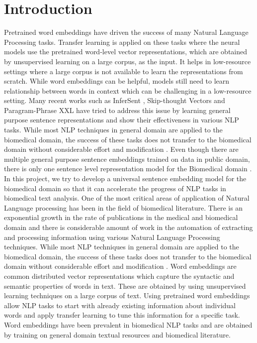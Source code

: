 \documentclass[11pt,a4paper]{article}
\begin{document}
\section{Introduction}
Pretrained word embeddings have driven the success of many Natural Language Processing tasks. Transfer learning is applied on these tasks where the neural models use the pretrained word-level vector representations, which are obtained by unsupervised learning on a large corpus, as the input. It helps in low-resource settings where a large corpus is not available to learn the representations from scratch. While word embeddings can be helpful, models still need to learn relationship between words in context which can be challenging in a low-resource setting. Many recent works such as InferSent \citep{conneau2017supervised}, Skip-thought Vectors\cite{kiros2015skip} and Paragram-Phrase XXL \cite{wieting2015towards} have tried to address this issue by learning general purpose sentence representations and show their effectiveness in various NLP tasks. While most NLP techniques in general domain are applied to the biomedical domain, the success of these tasks does not transfer to the biomedical domain without considerable effort and modification \cite{DBLP:sciSpacy}. Even though there are multiple general purpose sentence embeddings trained on data in public domain, there is only one sentence level representation model for the Biomedical domain \cite{chen2018biosentvec}. In this project, we try to develop a universal sentence embedding model for the biomedical domain so that it can accelerate the progress of NLP tasks in biomedical text analysis.
\iffalse
One of the most critical areas of application of Natural Language processing has been in the field of biomedical literature. There is an exponential growth in the rate of publications in the medical and biomedical domain \cite{DBLP:journals/corr/BornmannM14} and there is considerable amount of work in the automation of extracting and processing information using various Natural Language Processing techniques. While most NLP techniques in general domain are applied to the biomedical domain, the success of these tasks does not transfer to the biomedical domain without considerable effort and modification \cite{DBLP:sciSpacy}.
Word embeddings are common distributed vector representations which capture the syntactic and semantic properties of words in text. These are obtained by using unsupervised learning techniques on a large corpus of text. Using pretrained word embeddings allow NLP tasks to start with already existing information about individual words and apply transfer learning to tune this information for a specific task. Word embeddings have been prevalent in biomedical NLP tasks and are obtained by training on general domain textual resources and biomedical literature.
\end{document}
